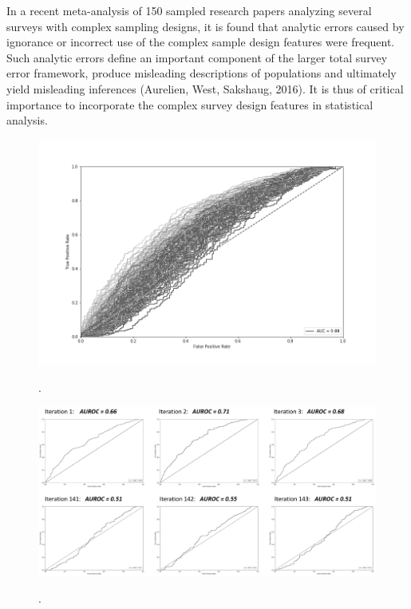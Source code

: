 In a recent meta-analysis of 150 sampled research papers analyzing several surveys with complex sampling designs, it is found that analytic errors caused by ignorance or incorrect use of the complex sample design features were frequent. Such analytic errors define an important component of the larger total survey error framework, produce misleading descriptions of populations and ultimately yield misleading inferences (Aurelien, West,  Sakshaug, 2016). It is thus of critical importance to incorporate the complex survey design features in statistical analysis. 


\begin{figure}[ht]
	\begin{center}
		\includegraphics[scale=0.55,angle=0]{fig/Roc_all}
		\label{occ}
		\vspace*{-1.0cm}
		\caption{.}
	\end{center}
\end{figure}

\begin{figure}[ht]
	\begin{center}
		\includegraphics[scale=0.40,angle=0]{fig/Discriminative_Procedure}
		\label{occ}
		\vspace*{-1.0cm}
		\caption{.}
	\end{center}
\end{figure}



